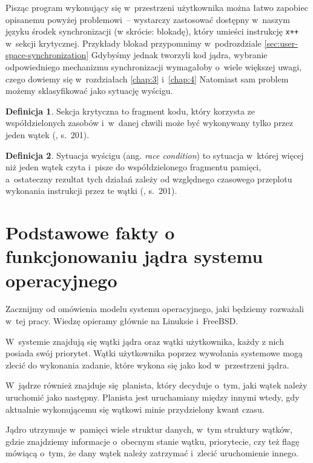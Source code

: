 \documentclass[shortabstract]{iithesis}
\theoremstyle{definition} \newtheorem*{definition}{Definicja}
\theoremstyle{definition} \newtheorem*{example}{Przykład}
\theoremstyle{definition} \newtheorem*{remark}{Uwaga}
\begin{document}
Pisząc program wykonujący się w~przestrzeni użytkownika można łatwo zapobiec opisanemu powyżej problemowi~--
wystarczy zastosować dostępny w~naszym języku środek synchronizacji (w skrócie: blokadę),
który umieści instrukcję \texttt{x++}
w~sekcji krytycznej. Przykłady blokad przypomnimy w~podrozdziale \ref{sec:user-space-synchronization}
Gdybyśmy jednak tworzyli kod jądra, wybranie odpowiedniego mechanizmu synchronizacji wymagałoby o~wiele
większej uwagi, czego dowiemy się w~rozdziałach \ref{chap:3} i~\ref{chap:4}
Natomiast sam problem możemy sklasyfikować jako sytuację wyścigu.

\begin{definition}
Sekcja krytyczna to fragment kodu, który korzysta ze współdzielonych zasobów i~w~danej
chwili może być wykonywany tylko przez jeden wątek (\cite{bib:stallings}, s.~201).
\end{definition}

\begin{definition}
Sytuacja wyścigu (ang. \textit{race condition}) to sytuacja w~której więcej niż jeden wątek czyta i~pisze do
współdzielonego fragmentu pamięci, a~ostateczny rezultat tych działań zależy od względnego czasowego przeplotu
wykonania instrukcji przez te wątki (\cite{bib:stallings}, s.~201).
\end{definition}

\section{Podstawowe fakty o funkcjonowaniu jądra systemu operacyjnego}

Zacznijmy od omówienia modelu systemu operacyjnego, jaki będziemy rozważali w~tej pracy.
Wiedzę opieramy głównie na Linuksie i~FreeBSD.

W~systemie znajdują się wątki jądra oraz wątki użytkownika, każdy z nich posiada swój priorytet.
Wątki użytkownika poprzez wywołania systemowe mogą zlecić
do wykonania zadanie, które wykona się jako kod w~przestrzeni jądra.

W~jądrze również znajduje się planista, który decyduje o~tym, jaki wątek należy uruchomić jako następny.
Planista jest uruchamiany między innymi wtedy, gdy aktualnie wykonującemu się wątkowi minie przydzielony
kwant czasu.

Jądro utrzymuje w~pamięci wiele struktur danych, w~tym struktury wątków, gdzie
znajdziemy informacje o~obecnym stanie wątku, priorytecie, czy też flagę mówiącą o~tym, że dany wątek należy
zatrzymać i~zlecić uruchomienie innego.
\end{document}
